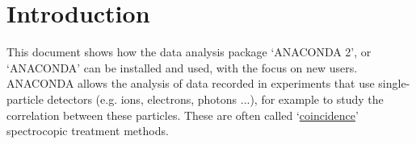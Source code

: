\section{Introduction}

This document shows how the data analysis package `ANACONDA 2', or `ANACONDA' can be installed and used, with the focus on new users. ANACONDA allows the analysis of data recorded in experiments that use single-particle detectors (e.g. ions, electrons, photons ...), for example to study the correlation between these particles. These are often called `\href{https://en.wikipedia.org/wiki/Photoelectron_photoion_coincidence_spectroscopy}{coincidence}' spectrocopic treatment methods.
